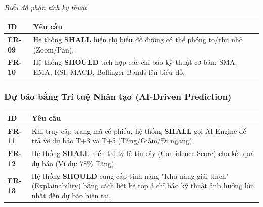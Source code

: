 \documentclass[12pt, a4paper]{article}
\begin{document}
\noindent\textit{Biểu đồ phân tích kỹ thuật}
\begin{table}[htbp]
    \centering
    \renewcommand{\arraystretch}{1.3}
    \begin{tabularx}{\textwidth}{|l|X|}
        \hline
        \rowcolor{gray!10}
        \textbf{ID}    & \textbf{Yêu cầu}                                                                                                 \\
        \hline
        \textbf{FR-09} & Hệ thống \textbf{SHALL} hiển thị biểu đồ đường có thể phóng to/thu nhỏ (Zoom/Pan).                               \\
        \hline
        \textbf{FR-10} & Hệ thống \textbf{SHOULD} tích hợp các chỉ báo kỹ thuật cơ bản: SMA, EMA, RSI, MACD, Bollinger Bands lên biểu đồ. \\
        \hline
    \end{tabularx}
\end{table}

\subsubsection{Dự báo bằng Trí tuệ Nhân tạo (AI-Driven Prediction)}

\begin{table}[H]
    \centering
    \renewcommand{\arraystretch}{1.3}
    \begin{tabularx}{\textwidth}{|l|X|}
        \hline
        \rowcolor{gray!10}
        \textbf{ID}    & \textbf{Yêu cầu}                                                                                                                                                    \\
        \hline
        \textbf{FR-11} & Khi truy cập trang mã cổ phiếu, hệ thống \textbf{SHALL} gọi AI Engine để trả về dự báo T+3 và T+5 (Tăng/Giảm/Đi ngang).                                             \\
        \hline
        \textbf{FR-12} & Hệ thống \textbf{SHALL} hiển thị tỷ lệ tin cậy (Confidence Score) cho kết quả dự báo (Ví dụ: 78\% Tăng).                                                            \\
        \hline
        \textbf{FR-13} & Hệ thống \textbf{SHOULD} cung cấp tính năng "Khả năng giải thích" (Explainability) bằng cách liệt kê top 3 chỉ báo kỹ thuật ảnh hưởng lớn nhất đến dự báo hiện tại. \\
        \hline
    \end{tabularx}
\end{table}
\end{document}
